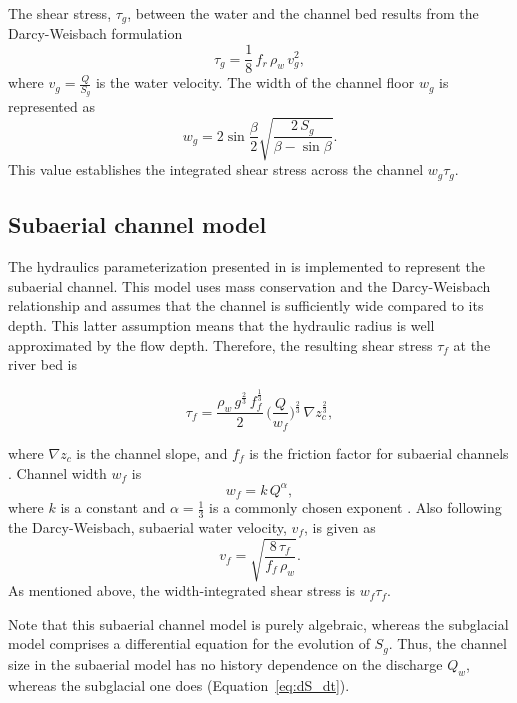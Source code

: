 \documentclass[tc, manuscript]{copernicus}
\begin{document}
The shear stress, $\tau_g$, between the water and the channel bed results from the Darcy-Weisbach formulation
\begin{equation}
  \label{eq:tau_g}
  \tau_g=\frac{1}{8}\,f_r\,\rho_w\,v_g^2,
\end{equation}
% 
where $v_g = \frac{Q}{S_g}$ is the water velocity.
% 
The width of the channel floor $w_g$ is represented as
\begin{equation}
  \label{eq:dh2wc}
  w_g = 2  \sin \frac{\beta}{2} \sqrt{\frac{2\, S_g}{\beta -\sin \beta}}.
\end{equation}
% 
This value establishes the integrated shear stress across the channel $w_g\tau_g$.

\subsection{Subaerial channel  model}
\label{sect:fluv}

The hydraulics parameterization presented in \citet{tucker1997} is implemented to represent the subaerial channel.
This model uses mass conservation and the Darcy-Weisbach relationship and assumes that the channel is sufficiently wide compared to its depth.
This latter assumption means that the hydraulic radius is well approximated by the flow depth.
Therefore, the resulting shear stress $\tau_f$ at the river bed is
\begin{linenomath*}
  \begin{equation}
    \label{eq:DW_tau}
    \tau_f=\frac{\rho_w\,g^{\frac{2}{3}}\,f_f^{\frac{1}{3}}}{2}\, \Big(\frac{Q}{w_f} \Big)^{\frac{2}{3}} \,\nabla z_c^{\frac{2}{3}},
  \end{equation}
\end{linenomath*}
where $\nabla z_c$ is the channel slope, and $f_f$ is the friction factor for subaerial channels \citep{tucker1997}.
Channel width $w_f$ is
\begin{equation}
  \label{eq:wcf}
  w_f = k \, Q^{\alpha},
\end{equation}
% 
where $k$ is a constant and $\alpha=\frac{1}{3}$ is a commonly chosen exponent \citep{leopold1953}.
Also following the Darcy-Weisbach, subaerial water velocity, $v_f$, is given as
\begin{equation}
  \label{eq:vf}
  v_f = \sqrt{\frac{8\,\tau_f}{f_f\,\rho_w}}.
\end{equation}
% 
As mentioned above, the width-integrated shear stress is $w_f\tau_f$.

Note that this subaerial channel model is purely algebraic, whereas the subglacial model comprises a differential equation for the evolution of $S_g$.
Thus, the channel size in the subaerial model has no history dependence on the discharge $Q_w$, whereas the subglacial one does (Equation~\ref{eq:dS_dt}).
\end{document}
